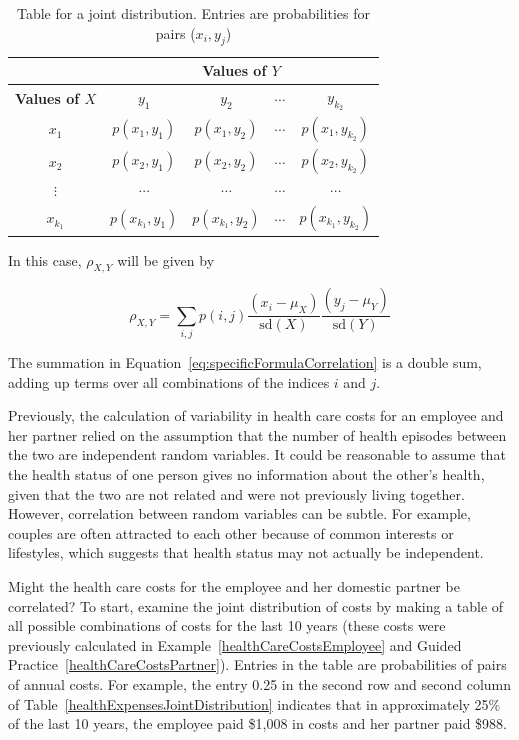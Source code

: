 \begin{table}[h]
	\caption{Table for a joint distribution. Entries are probabilities for pairs ($x_i, y_j$)}
	\label{table:generalJointDistribution}
	\centering
	\begin{tabular}{ccccc}
		\hline
		& \multicolumn{4}{c}{\textbf{Values of $Y$}} \\
		\hline
		\textbf{Values of $X$} & $y_1$ & $y_2$ & $\cdots$ & $y_{k_2}$ \\
		             $x_1$ &   $p(x_1, y_1)$ &   $p(x_1, y_2)$  & $\cdots$  & $p(x_1, y_{k_2})$  \\
		              $x_2$ &  $p(x_2, y_1)$   &  $p(x_2, y_2)$  & $\cdots$ &   $p(x_2, y_{k_2})$ \\
		             $\vdots$ &   $\cdots$  &  $\cdots$  &  $\cdots$ &   $\cdots$ \\
		              $x_{k_1}$ & $p(x_{k_1}, y_1)$ &  $p(x_{k_1}, y_2)$  &  $\cdots$ & $p(x_{k_1}, y_{k_2})$ \\
		             
	\end{tabular}
\end{table}

In this case, $\rho_{X,Y}$ will be given by

\begin{equation}
	\rho_{X,Y} = \sum_{i,j} p(i,j)\frac{(x_i - \mu_X)}{\textrm{sd}(X)}\frac{(y_j - \mu_Y)}{\textrm{sd}(Y)}
	\label{eq:specificFormulaCorrelation}
\end{equation}

The summation in Equation~\ref{eq:specificFormulaCorrelation} is a double sum, adding up terms over all combinations of the indices $i$ and $j$.

Previously, the calculation of variability in health care costs for an employee and her partner relied on the assumption that the number of health episodes between the two are independent random variables. It could be reasonable to assume that the health status of one person gives no information about the other's health, given that the two are not related and were not previously living together. However, correlation between random variables can be subtle. For example, couples are often attracted to each other because of common interests or lifestyles, which suggests that health status may not actually be independent.

Might the health care costs for the employee and her domestic partner be correlated? To start, examine the joint distribution of costs by making a table of all possible combinations of costs for the last 10 years (these costs were previously calculated in Example~\ref{healthCareCostsEmployee} and Guided Practice~\ref{healthCareCostsPartner}). Entries in the table are probabilities of pairs of annual costs. For example, the entry 0.25 in the second row and second column of Table~\ref{healthExpensesJointDistribution} indicates that in approximately 25\% of the last 10 years, the employee paid \$1,008 in costs and her partner paid \$988.

